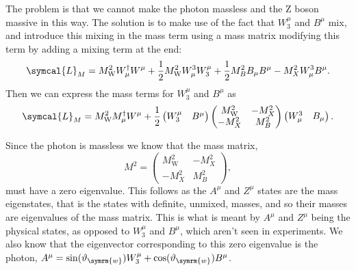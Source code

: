 \documentclass[fleqn]{NotesClass}
\newcommand{\Pparticle}[1]{\mathrm{#1}}
\newcommand{\PZ}{\ensuremath{\Pparticle{Z}}}
\newcommand{\PW}{\ensuremath{\Pparticle{W}}}
\newcommand{\hermit}{\dagger}
\newcommand{\lagrangianDensity}{\symcal{L}}
\newcommand{\weinbergangle}{\vartheta_{\symrm{w}}}
\begin{document}
    The problem is that we cannot make the photon massless and the \PZ{} boson massive in this way.
    The solution is to make use of the fact that \(W_3^\mu\) and \(B^\mu\) mix, and introduce this mixing in the mass term using a mass matrix modifying this term by adding a mixing term at the end:
    \begin{equation}
        \lagrangianDensity_M = M_{\PW}^2 W_\mu^\hermit W^\mu + \frac{1}{2}M_{\PW}^2 W^3_\mu W_3^\mu + \frac{1}{2}M_B^2 B_\mu B^\mu - M_X^2 W^3_\mu B^\mu.
    \end{equation}
    Then we can express the mass terms for \(W_3^\mu\) and \(B^\mu\) as
    \begin{equation}
        \lagrangianDensity_M = M_{\PW}^2 M_\mu^\hermit W^\mu + \frac{1}{2}
        \begin{pmatrix}
            W_3^\mu & B^\mu
        \end{pmatrix}
        \begin{pmatrix}
            M_{\PW}^2 & -M_X^2\\
            -M_X^2 & M_B^2
        \end{pmatrix}
        \begin{pmatrix}
            W^3_\mu & B_\mu
        \end{pmatrix}
        .
    \end{equation}
    
    Since the photon is massless we know that the mass matrix,
    \begin{equation}
        M^2 = 
        \begin{pmatrix}
            M_{\PW}^2 & -M_X^2\\
            -M_X^2 & M_B^2
        \end{pmatrix}
        ,
    \end{equation}
    must have a zero eigenvalue.
    This follows as the \(A^\mu\) and \(Z^\mu\) states are the mass eigenstates, that is the states with definite, unmixed, masses, and so their masses are eigenvalues of the mass matrix.
    This is what is meant by \(A^\mu\) and \(Z^\mu\) being the physical states, as opposed to \(W_3^\mu\) and \(B^\mu\), which aren't seen in experiments.
    We also know that the eigenvector corresponding to this zero eigenvalue is the photon, \(A^\mu = \sin(\weinbergangle) W_3^\mu + \cos(\weinbergangle)B^\mu\).
    
\end{document}
